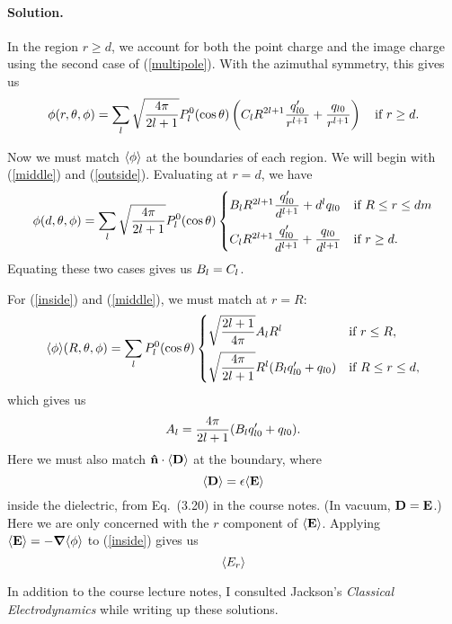 \documentclass[11pt]{article}
\newcommand{\refeq}[1]{(\ref{#1})}
\newcommand{\beq}{\begin{equation*}}
\newcommand{\eeq}{\end{equation*}}
\newcommand{\beqn}{\begin{equation}}
\newcommand{\eeqn}{\end{equation}}
\newenvironment{solution}
{
    \paragraph{Solution.}
    \ignorespaces
}
{
    \bigskip
}
\begin{document}
\begin{solution}
	In the region $r \geq d$, we account for both the point charge and the image charge using the second case of \refeq{multipole}.  With the azimuthal symmetry, this gives us
	\beqn \label{outside}
		\phirtp) = \sum_{l} \sqrt{\frac{4\pi}{2l+1}} \Ploct \left( \Cl R^{2l+1} \frac{\qplo}{r^{l+1}} + \frac{\qlo}{r^{l+1}} \right) \quad \tif r \geq d.
	\eeqn
	
	Now we must match $\evphi$ at the boundaries of each region.  We will begin with \refeq{middle} and \refeq{outside}.  Evaluating at $r = d$, we have
	\beq
		\phi(d, \tht, \phi) = \sum_{l} \sqrt{\frac{4\pi}{2l+1}} \Ploct
		\begin{cases} \Bl R^{2l+1} \dfrac{\qplo}{d^{l+1}} + d^l \qlo & \tif R \leq r \leq dm \\[2ex]
		\Cl R^{2l+1} \dfrac{\qplo}{d^{l+1}} + \dfrac{\qlo}{d^{l+1}} & \tif r \geq d. \end{cases}
	\eeq
	Equating these two cases gives us $B_l = C_l$.
	
	For \refeq{inside} and \refeq{middle}, we must match at $r = R$:
	\beq
		\evphi\!(R, \tht, \phi) = \sum_{l} \Ploct \begin{cases} \sqrt{\dfrac{2l + 1}{4\pi}} \Al R^l & \tif r \leq R, \\[2ex]
		\sqrt{\dfrac{4\pi}{2l+1}} R^l (\Bl \qplo + \qlo) & \tif R \leq r \leq d, \end{cases}
	\eeq
	which gives us
	\beq
		\Al = \frac{4\pi}{2l+1} (\Bl \qplo + \qlo).
	\eeq
	Here we must also match $\nh \cdot \evD$ at the boundary, where
	\beqn \label{D}
		\evD = \eps \!\evE
	\eeqn
	inside the dielectric, from Eq.~(3.20) in the course notes.  (In vacuum, $\vb{D} = \vb{E}$.)  Here we are only concerned with the $r$ component of $\evE$.  Applying $\evE = -\grad\!\evphi$ to \refeq{inside} gives us
	\beq
		\evEr
	\eeq
\end{solution}


\clearpage




\vfill
In addition to the course lecture notes, I consulted Jackson's \emph{Classical Electrodynamics} while writing up these solutions.
\end{document}
